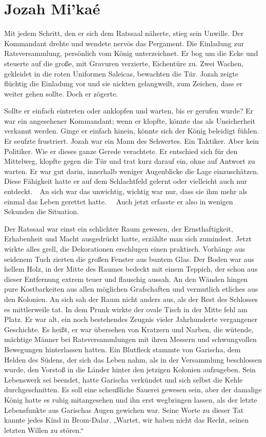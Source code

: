 
\chapter{Jozah Mi’kaé}

Mit jedem Schritt, den er sich dem Ratssaal näherte, stieg sein Unwille. Der Kommandant drehte und 
wendete nervös das Pergament. Die Einladung zur Ratsversammlung, persönlich vom König unterzeichnet. 
Er bog um die Ecke und steuerte auf die große, mit Gravuren verzierte, Eichentüre zu. Zwei Wachen, 
gekleidet in die roten Uniformen Saleicas, bewachten die Tür. Jozah zeigte flüchtig die Einladung 
vor und sie nickten gelangweilt, zum Zeichen, dass er weiter gehen sollte. Doch er zögerte.

 Sollte er einfach eintreten oder anklopfen und warten, bis er gerufen wurde? Er war ein angesehener 
Kommandant; wenn er klopfte, könnte das als Unsicherheit verkannt werden. Ginge er einfach hinein, 
könnte sich der König beleidigt fühlen. Er seufzte frustriert. Jozah war ein Mann des Schwertes. Ein 
Taktiker. Aber kein Politiker. Wie er dieses ganze Gerede verachtete. Er entschied sich für den 
Mittelweg, klopfte gegen die Tür und trat kurz darauf ein, ohne auf Antwort zu warten. Er war gut 
darin, innerhalb weniger Augenblicke die Lage einzuschätzen. Diese Fähigkeit hatte er auf dem 
Schlachtfeld gelernt oder vielleicht auch nur entdeckt.~~An sich war das unwichtig, wichtig war nur, 
dass sie ihm mehr als einmal das Leben gerettet hatte. ~~Auch jetzt erfasste er also in wenigen 
Sekunden die Situation.
 
 Der Ratssaal war einst ein schlichter Raum gewesen, der Ernsthaftigkeit, Erhabenheit und Macht 
ausgedrückt hatte, erzählte man sich zumindest. Jetzt wirkte alles grell, die Dekorationen 
erschlugen einen praktisch. Vorhänge aus seidenem Tuch zierten die großen Fenster aus buntem Glas. 
Der Boden war aus hellem Holz, in der Mitte des Raumes bedeckt mit einem Teppich, der schon aus 
dieser Entfernung extrem teuer und flauschig aussah. An den Wänden hingen pure Kostbarkeiten aus 
allen möglichen Grafschaften und vermutlich etliches aus den Kolonien. An sich sah der Raum nicht 
anders aus, als der Rest des Schlosses es mittlerweile tat. In dem Prunk wirkte der ovale Tisch in 
der Mitte fehl am Platz. Er war alt, ein noch bestehendes Zeugnis vieler Jahrhunderte vergangener 
Geschichte. Es heißt, er war übersehen von Kratzern und Narben, die wütende, mächtige Männer bei 
Ratsversammlungen mit ihren Messern und schwungvollen Bewegungen hinterlassen hatten. Ein Blutfleck 
stammte von Garischa, dem Helden des Südens, der sich das Leben nahm, als in der Versammlung 
beschlossen wurde, den Vorstoß in die Länder hinter den jetzigen Kolonien aufzugeben. Sein 
Lebenswerk sei beendet, hatte Garischa verkündet und sich selbst die Kehle durchgeschnitten. Es soll 
eine scheußliche Sauerei gewesen sein, aber der damalige König hatte es ruhig mitangesehen und ihn 
erst wegbringen lassen, als der letzte Lebensfunkte aus Garischas Augen gewichen war. Seine Worte zu 
dieser Tat kannte jedes Kind in Brom-Dalar. „Wartet, wir haben nicht das Recht, seinen letzten 
Willen zu stören.“
 

